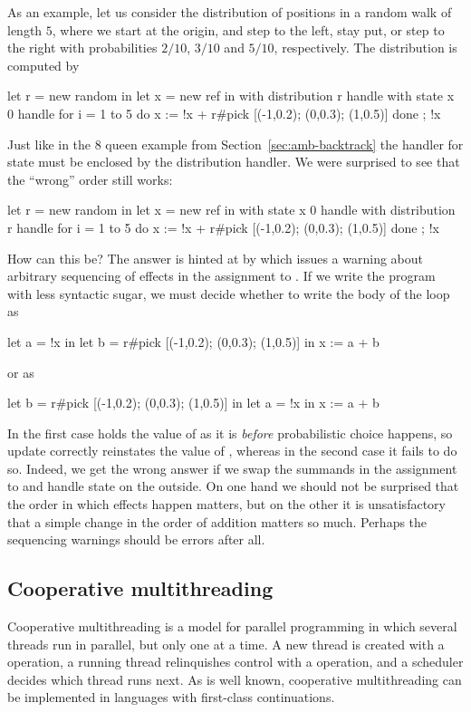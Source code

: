 As an example, let us consider the distribution of positions in a random walk of length $5$, where we start at the origin, and step to the left, stay put, or step to the right with probabilities $2/10$, $3/10$ and $5/10$, respectively. The distribution is computed by
%
\begin{source}
let r = new random in
let x = new ref in
with distribution r handle
with state x 0 handle
  for i = 1 to 5 do
    x := !x + r#pick [(-1,0.2); (0,0.3); (1,0.5)]
  done ;
  !x
\end{source}
%
Just like in the 8 queen example from Section~\ref{sec:amb-backtrack} the handler for state must be enclosed by the distribution handler. We were surprised to see that the ``wrong'' order still works:
%
\begin{source}
let r = new random in
let x = new ref in
with state x 0 handle
with distribution r handle
  for i = 1 to 5 do
    x := !x + r#pick [(-1,0.2); (0,0.3); (1,0.5)]
  done ;
  !x
\end{source}
%
How can this be? The answer is hinted at by \eff which issues a warning about arbitrary sequencing of effects in the assignment to . If we write the program with less syntactic sugar, we must decide whether to write the body of the loop as
%
\begin{source}
let a = !x in
let b = r#pick [(-1,0.2); (0,0.3); (1,0.5)] in
  x := a + b
\end{source}
%
or as
%
\begin{source}
let b = r#pick [(-1,0.2); (0,0.3); (1,0.5)] in
let a = !x in
  x := a + b
\end{source}
%
In the first case  holds the value of  as it is \emph{before}
probabilistic choice happens, so update correctly reinstates the value of , whereas in the second case it fails to do so. Indeed, we get the wrong answer if we swap the summands in the assignment to  and handle state on the outside. On one hand we should not be surprised that the order in which effects happen matters, but on the other it is unsatisfactory that a simple change in the order of addition matters so much. Perhaps the sequencing warnings should be errors after all.

\subsection{Cooperative multithreading}
\label{sec:cooperative-multithreading}

Cooperative multithreading is a model for parallel programming in which several threads run in parallel, but only one at a time. A new thread is created with a  operation, a running thread relinquishes control with a  operation, and a scheduler decides which thread runs next. As is well known, cooperative multithreading can be implemented in languages with first-class continuations.


